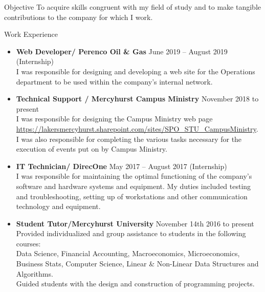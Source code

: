 \documentclass[11pt]{resume} %
\newcommand{\bold}[1]{\textbf{#1}}
\begin{document}
	
\begin{rSection}{Objective}
	To acquire skills congruent with my field of study and to make tangible contributions to the company for which I work.
\end{rSection}
\begin{rSection}{Work Experience}
\begin{itemize}
	
	\item\bold{Web Developer/ Perenco Oil \& Gas} \quad June 2019 – August 2019 (Internship)\\
	I was responsible for designing and developing a web site for the Operations department to be used within the company's internal network.\\
	
	
	\item\bold{Technical Support / Mercyhurst Campus Ministry} \quad November 2018 to present\\
	 I was responsible for designing the Campus Ministry web page  \url{https://lakersmercyhurst.sharepoint.com/sites/SPO_STU_CampusMinistry}.\\
	I was also responsible for completing the various tasks necessary for the execution of events put on by Campus Ministry.\\
	
	\item\bold{IT Technician/ DirecOne} \quad May 2017 – August 2017 (Internship)\\
	I was responsible for maintaining the optimal functioning of the company’s software and hardware systems and equipment. My duties included testing and troubleshooting, setting up of workstations and other communication technology and equipment.\\
	
	\item\bold{Student Tutor/Mercyhurst University} \quad November 14th 2016 to present\\
	Provided individualized and group assistance to students in the following courses:\\ Data Science, Financial Accounting, Macroeconomics, Microeconomics, Business Stats, Computer Science, Linear \& Non-Linear Data Structures and Algorithms.\\
	Guided students with the design and construction of programming projects.
	\\
	
\end{itemize}
\end{rSection}
\end{document}
